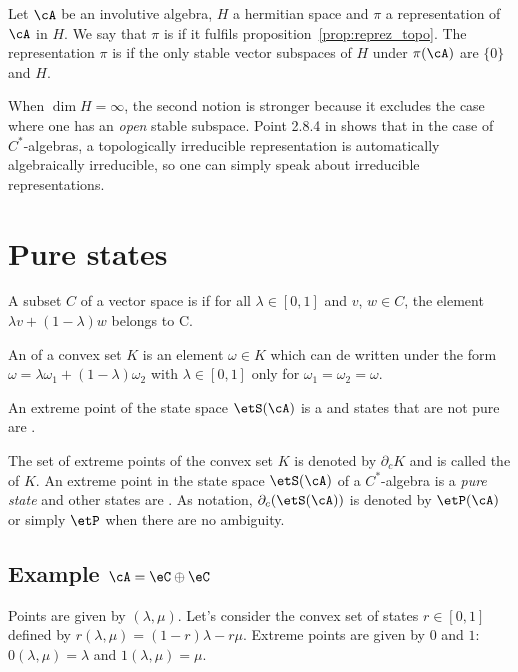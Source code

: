 \begin{definition}
Let $\cA$ be an involutive algebra, $H$ a hermitian space and $\pi$ a representation of $\cA$ in $H$. We say that $\pi$ is  if it fulfils proposition~\ref{prop:reprez_topo}. The representation $\pi$ is  if the only stable vector subspaces of $H$ under $\pi(\cA)$ are $\{0\}$ and $H$.
\end{definition}

When $\dim H=\infty$, the second notion is stronger because it excludes the case where one has an \emph{open} stable subspace. Point 2.8.4 in \cite{Dixmier} shows that in the case of $C^*$-algebras, a topologically irreducible representation is automatically algebraically irreducible, so one can simply speak about irreducible representations.

%
   \section{Pure states}
%


A subset $C$ of a vector space is  if for all $\lambda\in[0,1]$ and $v$, $w\in C$, the element $\lambda v+(1-\lambda)w$ belongs to C.

An  of a convex set $K$ is an element $\omega\in K$ which can de written under the form $\omega=\lambda\omega_1+(1-\lambda)\omega_2$ with $\lambda\in[0,1]$ only for $\omega_1=\omega_2=\omega$.

\begin{definition}
An extreme point of the state space $\etS(\cA)$ is a  and states that are not pure are .
\end{definition}

The set of extreme points of the convex set $K$ is denoted by $\partial_cK$ and is called the  of $K$.  An extreme point in the state space $\etS(\cA)$ of a $C^*$-algebra is a \emph{pure state} and other states are . As notation, $\partial_c(\etS(\cA))$ is denoted by $\etP(\cA)$ or simply $\etP$ when there are no ambiguity.

\subsection*{Example \texorpdfstring{$\cA=\eC\oplus\eC$}{A=C+C}}
 Points are given by $(\lambda,\mu)$. Let's consider the convex set of states $r\in[0,1]$ defined by $r(\lambda,\mu)=(1-r)\lambda-r\mu$.  Extreme points are given by $0$ and $1$: $0(\lambda, \mu)=\lambda$ and $1(\lambda,\mu)=\mu$.

